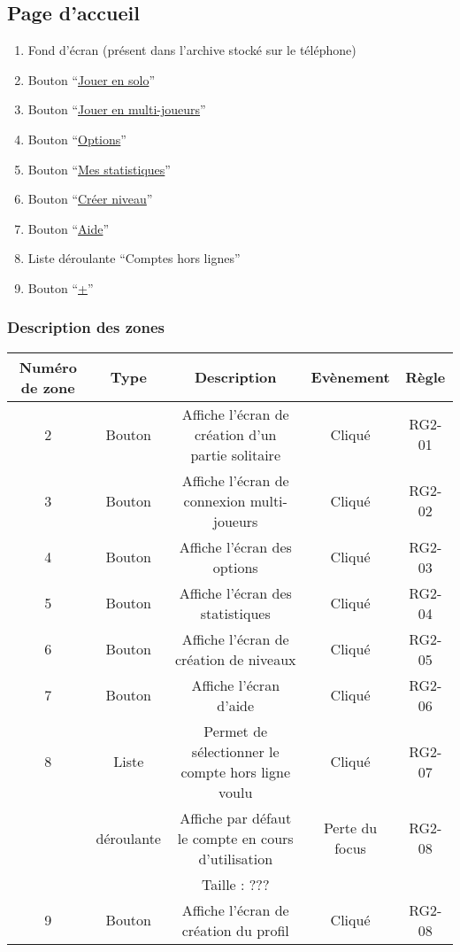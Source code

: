 \documentclass{report}
\begin{document}
\newpage

	\subsection{Page d'accueil}
		\hypertarget{Page d'accueil}{}
		\label{accueil}

		\begin{center}	
			
		\end{center}

		\begin{enumerate}
		  \item Fond d'écran (présent dans l'archive stocké sur le téléphone)
		  \item Bouton ``\hyperlink{Creer partie solo}{Jouer en solo}''
		  \item Bouton ``\hyperlink{Connexion multi-joueurs}{Jouer en multi-joueurs}''
		  \item Bouton ``\hyperlink{Options}{Options}''
		  \item Bouton ``\hyperlink{Statistiques}{Mes statistiques}''
		  \item Bouton ``\hyperlink{Creer niveau}{Créer niveau}''
		  \item Bouton ``\hyperlink{Aide}{Aide}''
		  \item Liste déroulante ``Comptes hors lignes''
		  \item Bouton ``\hyperlink{profil}{+}'' 
		\end{enumerate}

		\subsubsection{Description des zones}
		
		\begin{tabular}{|c|c|c|c|c|} \hline
			Numéro de zone & Type  & Description & Evènement &	Règle \\\hline 
			2 & Bouton & Affiche l'écran de création d'un partie solitaire & Cliqué & RG2-01 \\\hline
			3 & Bouton & Affiche l'écran de connexion multi-joueurs & Cliqué & RG2-02 \\\hline
			4 & Bouton & Affiche l'écran des options & Cliqué & RG2-03 \\\hline
			5 & Bouton & Affiche l'écran des statistiques & Cliqué & RG2-04 \\\hline
			6 & Bouton & Affiche l'écran de création de niveaux & Cliqué & RG2-05 \\\hline
			7 & Bouton & Affiche l'écran d'aide & Cliqué & RG2-06 \\\hline
			8 & Liste & Permet de sélectionner le compte hors ligne voulu & Cliqué & RG2-07 \\ 
			  & déroulante & Affiche par défaut le compte en cours d'utilisation & Perte du focus & RG2-08\\
			  & & Taille : ??? & & \\\hline
			9 & Bouton & Affiche l'écran de création du profil & Cliqué & RG2-08 \\\hline
			
		\end{tabular}
		
\end{document}

